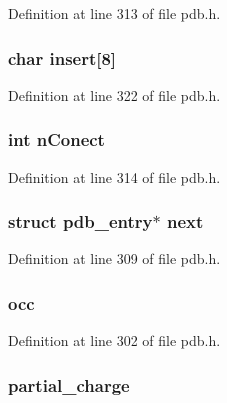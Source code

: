 Definition at line 313 of file pdb.\-h.

\hypertarget{structpdb__entry_a8cc72faf0908e6fff29637c614e608ed}{
\subsubsection[{insert}]{\setlength{\rightskip}{0pt plus 5cm}char insert\mbox{[}8\mbox{]}}}\label{structpdb__entry_a8cc72faf0908e6fff29637c614e608ed}


Definition at line 322 of file pdb.\-h.

\hypertarget{structpdb__entry_aa72c88ae20e4abf7effe69444a442867}{
\subsubsection[{n\-Conect}]{\setlength{\rightskip}{0pt plus 5cm}int n\-Conect}}\label{structpdb__entry_aa72c88ae20e4abf7effe69444a442867}


Definition at line 314 of file pdb.\-h.

\hypertarget{structpdb__entry_a9cc124a622ed031128bab9aac13f9145}{
\subsubsection[{next}]{\setlength{\rightskip}{0pt plus 5cm}struct {\bf pdb\-\_\-entry}$\ast$ next}}\label{structpdb__entry_a9cc124a622ed031128bab9aac13f9145}


Definition at line 309 of file pdb.\-h.

\hypertarget{structpdb__entry_aa16670bec839ae64c16b12fa90810973}{
\subsubsection[{occ}]{ occ}}\label{structpdb__entry_aa16670bec839ae64c16b12fa90810973}


Definition at line 302 of file pdb.\-h.

\hypertarget{structpdb__entry_a0b6d4737223c265ff150250aa2f3cd9c}{
\subsubsection[{partial\-\_\-charge}]{ partial\-\_\-charge}}\label{structpdb__entry_a0b6d4737223c265ff150250aa2f3cd9c}


